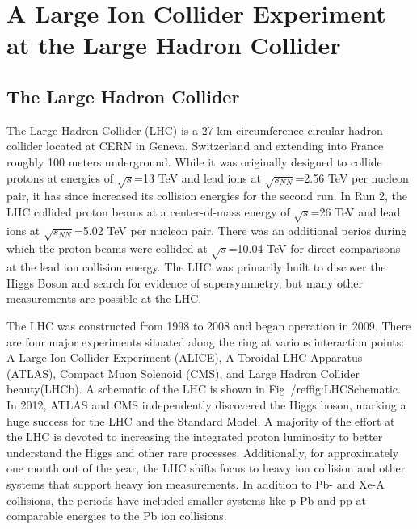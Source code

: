 \chapter{A Large Ion Collider Experiment at the Large Hadron Collider} \label{ch:ALICE}

\section{The Large Hadron Collider}

The Large Hadron Collider (LHC) is a 27 km circumference circular hadron collider located at CERN in Geneva, Switzerland and extending into France roughly 100 meters underground. While it was originally designed to collide protons at energies of $\sqrt{s}$=13 TeV and lead ions at $\sqrt{s_{NN}}$=2.56 TeV per nucleon pair, it has since increased its collision energies for the second run. In Run 2, the LHC collided proton beams at a center-of-mass energy of $\sqrt{s}$=26 TeV and lead ions at $\sqrt{s_{NN}}$=5.02 TeV per nucleon pair. There was an additional perios during which the proton beams were collided at $\sqrt{s}$=10.04 TeV for direct comparisons at the lead ion collision energy. The LHC was primarily built to discover the Higgs Boson and search for evidence of supersymmetry, but many other measurements are possible at the LHC.

The  LHC was constructed from 1998 to 2008 and began  operation in 2009. There are four major experiments situated along the ring at various interaction points: A Large Ion Collider Experiment (ALICE), A Toroidal LHC Apparatus (ATLAS), Compact Muon Solenoid (CMS), and Large Hadron Collider beauty(LHCb). A schematic of the LHC is shown in Fig~/ref{fig:LHCSchematic}. In 2012, ATLAS and CMS independently discovered the Higgs boson, marking a huge success for the LHC and the Standard Model. A majority of the effort at the LHC is devoted to increasing the integrated proton luminosity to better understand the Higgs and other rare processes. Additionally, for approximately one month out of the year, the LHC shifts focus to heavy ion collision and other systems that support heavy ion measurements. In addition to Pb- and Xe-A collisions, the periods have included smaller systems like p-Pb and pp at comparable energies to the Pb ion collisions.

